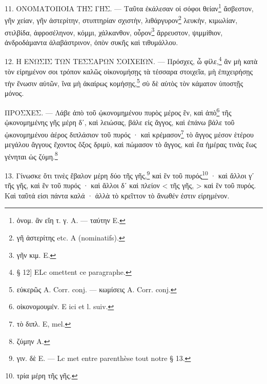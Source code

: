 \documentclass[a4paper, 11pt, oneside, polutonikogreek, french]{article}
\begin{document}
11. ΟΝΟΜΑΤΟΠΟΙΑ ΤΗΣ ΓΗΣ. --- Ταῦτα ἐκάλεσαν οἱ σόφοι θείαν\footnote{ὀνομ. ἂν εἴη τ. γ. A. --- ταύτην E.} ἄσβεστον, γῆν χείαν, γῆν ἀστερίτην, στυπτηρίαν σχιστὴν, λιθάργυρον\footnote{γῆ ἀστερίτης etc. A (nominatifs).} λευκὴν, κιμωλίαν, στιλβίδα, ἀφροσέληνον, κόμμι, χάλκανθον, οὖρον\footnote{γῆν κιμ. E.} ἄρρευστον, ψιμμίθιον, ἀνδροδάμαντα ἀλαβάστρινον, ὀπὸν συκῆς καὶ τιθυμάλλου.

12. Η ΕΝΩΣΙΣ ΤΩΝ ΤΕΣΣΑΡΩΝ ΣΟΙΧΕΙΩΝ. --- Πρόσχες, ὦ φίλε,\footnote{§ 12] ELc omettent ce paragraphe.} ἂν μὴ κατὰ τὸν εἰρημένον σοι τρόπον καλῶς οἰκονομήσῃς τὰ τέσσαρα στοιχεῖα, μὴ ἐπιχειρήσῃς τὴν ἕνωσιν αὐτῶν, ἵνα μὴ ἀκαίρως κομήσῃς,\footnote{εὐκερῶς A. Corr. conj. --- κωμίσεις A. Corr. conj.} σὺ δὲ αὐτὸς τὸν κάματον ὑποστῇς μόνος.

ΠΡΟΣΧΕΣ. --- Λάβε ἀπὸ τοῦ ᾠκονομημένου πυρὸς μέρος ἓν, καὶ ἀπὸ\footnote{οἰκονομουμέν. E ici et l. suiv.} τῆς ᾠκονομημένης γῆς μέρη δʹ, καὶ λειώσας, βάλε εἰς ἄγγος, καὶ ἐπάνω βάλε τοῦ ᾠκονομημένου ἀέρος διπλάσιον τοῦ πυρός · καὶ κρέμασον\footnote{τὸ διπλ. E, mel.} τὸ ἄγγος μέσον ἑτέρου μεγάλου ἄγγους ἔχοντος ὄξος δριμὺ, καὶ πώμασον τὸ ἄγγος, καὶ ἔα ἡμέρας τινὰς ἕως γένηται ὡς ζύμη.\footnote{ζύμην A.}

13. Γίνωσκε ὅτι τινὲς ἔβαλον μέρη δύο τῆς γῆς,\footnote{γιν. δὲ E. --- Lc met entre parenthèse tout notre § 13.} καὶ ἓν τοῦ πυρός\footnote{τρία μέρη τῆς γῆς.} · καὶ ἄλλοι γʹ τῆς γῆς, καὶ ἓν τοῦ πυρός · καὶ ἄλλοι δʹ καὶ πλείον < τῆς γῆς, > καὶ ἓν τοῦ πυρός. Καὶ ταῦτά εἰσι πάντα καλά · ἀλλὰ τὸ κρεῖττον τὸ ἄνωθέν ἐστιν εἰρημένον.
\end{document}

